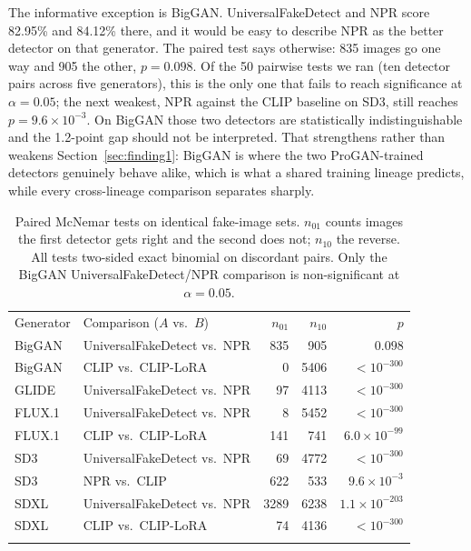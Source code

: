 \documentclass[3p,times,procedia]{elsarticle}
\begin{document}
The informative exception is BigGAN. UniversalFakeDetect and NPR score
82.95\% and 84.12\% there, and it would be easy to describe NPR as the
better detector on that generator. The paired test says otherwise: 835
images go one way and 905 the other, $p = 0.098$. Of the 50 pairwise tests
we ran (ten detector pairs across five generators), this is the only one
that fails to reach significance at $\alpha = 0.05$; the next weakest,
NPR against the CLIP baseline on SD3, still reaches $p = 9.6\times10^{-3}$.
On BigGAN those two detectors are statistically indistinguishable and the
1.2-point gap should not be interpreted. That strengthens rather than
weakens Section~\ref{sec:finding1}: BigGAN is where the two ProGAN-trained
detectors genuinely behave alike, which is what a shared training lineage
predicts, while every cross-lineage comparison separates sharply.

\begin{table}[h]
\caption{Paired McNemar tests on identical fake-image sets. $n_{01}$ counts
images the first detector gets right and the second does not; $n_{10}$ the
reverse. All tests two-sided exact binomial on discordant pairs. Only the
BigGAN UniversalFakeDetect/NPR comparison is non-significant at
$\alpha=0.05$.}
\label{tab:mcnemar}
\begin{tabular*}{\hsize}{@{\extracolsep{\fill}}llrrr@{}}
\toprule
Generator & Comparison ($A$ vs.\ $B$) & $n_{01}$ & $n_{10}$ & $p$ \\
\colrule
BigGAN & UniversalFakeDetect vs.\ NPR & 835 & 905 & $0.098$ \\
BigGAN & CLIP vs.\ CLIP-LoRA & 0 & 5406 & $<10^{-300}$ \\
GLIDE & UniversalFakeDetect vs.\ NPR & 97 & 4113 & $<10^{-300}$ \\
FLUX.1 & UniversalFakeDetect vs.\ NPR & 8 & 5452 & $<10^{-300}$ \\
FLUX.1 & CLIP vs.\ CLIP-LoRA & 141 & 741 & $6.0\times10^{-99}$ \\
SD3 & UniversalFakeDetect vs.\ NPR & 69 & 4772 & $<10^{-300}$ \\
SD3 & NPR vs.\ CLIP & 622 & 533 & $9.6\times10^{-3}$ \\
SDXL & UniversalFakeDetect vs.\ NPR & 3289 & 6238 & $1.1\times10^{-203}$ \\
SDXL & CLIP vs.\ CLIP-LoRA & 74 & 4136 & $<10^{-300}$ \\
\botrule
\end{tabular*}
\end{table}
\end{document}

